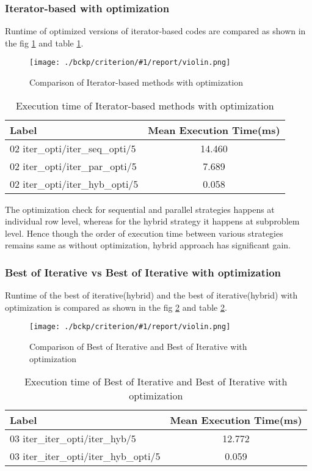 \documentclass{article}
\newcommand{\loadGraph}[3]{{%
\begin{figure}[!ht]
    \texttt{[image: ./bckp/criterion/\#1/report/violin.png]}
    \caption{#3}
    \label{#2}
\end{figure}}
}%
\begin{document}
\subsubsection{Iterator-based with optimization}
Runtime of optimized versions of iterator-based codes are compared as shown in the fig \ref{02_iter_opti} and table \ref{iter_opti}.

\loadGraph{02 iter_opti}{02_iter_opti}{Comparison of Iterator-based methods with optimization}


\begin{table}[!ht]
\centering
\begin{tabular}{lc}
\toprule
Label                           & Mean Execution Time(ms) \\ \midrule
02 iter\_opti/iter\_seq\_opti/5 & 14.460                  \\
02 iter\_opti/iter\_par\_opti/5 & 7.689                   \\
02 iter\_opti/iter\_hyb\_opti/5 & 0.058                   \\ \bottomrule
\end{tabular}
\caption{Execution time of Iterator-based methods with optimization}
\label{iter_opti}
\end{table}

The optimization check for sequential and parallel strategies happens at individual row level, whereas for the hybrid strategy it happens at subproblem level.
Hence though the order of execution time between various strategies remains same as without optimization, hybrid approach has significant gain.

\subsubsection{Best of Iterative vs Best of Iterative with optimization}
Runtime of the best of iterative(hybrid) and the best of iterative(hybrid) with optimization is compared as shown in the fig \ref{03_iter_iter_opti} and table \ref{iter_iter_opti}.

\loadGraph{03 iter_iter_opti}{03_iter_iter_opti}{Comparison of Best of Iterative and Best of Iterative with optimization}

\begin{table}[!ht]
\centering
\begin{tabular}{lc}    
\toprule
Label                                & Mean Execution Time(ms) \\ \midrule
03 iter\_iter\_opti/iter\_hyb/5      & 12.772                  \\
03 iter\_iter\_opti/iter\_hyb\_opti/5 & 0.059                   \\ \bottomrule
\end{tabular}
\caption{Execution time of Best of Iterative and Best of Iterative with optimization}
\label{iter_iter_opti}
\end{table}
\end{document}
